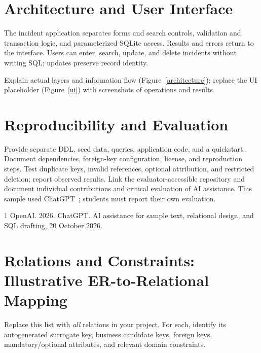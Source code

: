 \documentclass[sigconf]{acmart}
\newcommand{\guidance}[1]{{\color{blue}#1}}
\begin{document}
\section{Architecture and User Interface}
The incident application separates forms and search controls, validation and transaction logic, and parameterized SQLite access. Results and errors return to the interface. Users can enter, search, update, and delete incidents without writing SQL; updates preserve record identity.



\guidance{Explain actual layers and information flow (Figure~\ref{architecture}); replace the UI placeholder (Figure~\ref{ui}) with screenshots of operations and results.}

\section{Reproducibility and Evaluation}
Provide separate DDL, seed data, queries, application code, and a quickstart. Document dependencies, foreign-key configuration, license, and reproduction steps. Test duplicate keys, invalid references, optional attribution, and restricted deletion; report observed results.
\guidance{Link the evaluator-accessible repository and document individual contributions and critical evaluation of AI assistance. This sample used ChatGPT~\cite{chatgpt}; students must report their own evaluation.}

\begin{thebibliography}{1}
 OpenAI. 2026. ChatGPT. AI assistance for sample text,
relational design, and SQL drafting, 20 October 2026.
\end{thebibliography}

\clearpage
\onecolumn
\section*{Relations and Constraints: Illustrative ER-to-Relational Mapping}
\small
\guidance{Replace this list with \emph{all} relations in your project. For each,
identify its autogenerated surrogate key, business candidate keys, foreign
keys, mandatory/optional attributes, and relevant domain constraints.}
\end{document}
